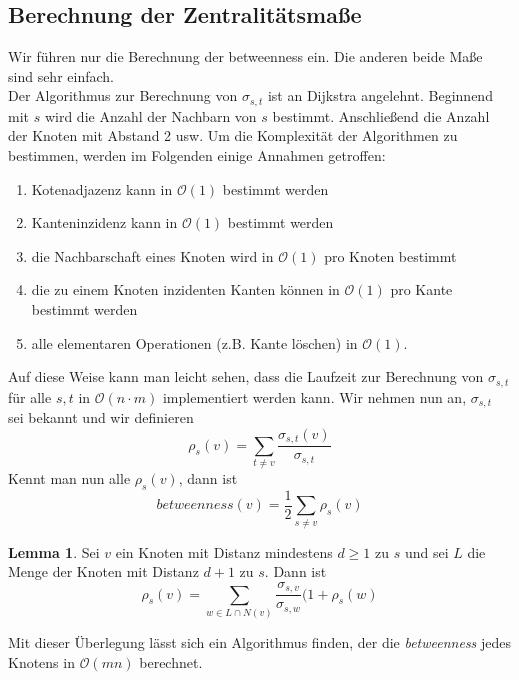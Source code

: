 \documentclass[a4paper, 12pt]{article}
\theoremstyle{plain}
\theoremstyle{definition}
\theoremstyle{lemma}
\newtheorem{lemma}[theorem]{Lemma}
\theoremstyle{remark}
\theoremstyle{corollary}
\theoremstyle{example}
\begin{document}
	\subsection{Berechnung der Zentralitätsmaße}
	Wir führen nur die Berechnung der betweenness ein. Die anderen beide Maße sind sehr einfach.\\
	Der Algorithmus zur Berechnung von $\sigma_{s,t}$ ist an Dijkstra angelehnt. Beginnend mit $s$ wird die Anzahl der Nachbarn von $s$ bestimmt. Anschließend die Anzahl der Knoten mit Abstand 2 usw.
	Um die Komplexität der Algorithmen zu bestimmen, werden im Folgenden einige Annahmen getroffen:
	\begin{enumerate}
		\item Kotenadjazenz kann in $\mathcal{O}(1)$ bestimmt werden
		\item Kanteninzidenz kann in $\mathcal{O}(1)$ bestimmt werden
		\item die Nachbarschaft eines Knoten wird in $\mathcal{O}(1)$ pro Knoten bestimmt
		\item die zu einem Knoten inzidenten Kanten können in $\mathcal{O}(1)$ pro Kante bestimmt werden
		\item alle elementaren Operationen (z.B. Kante löschen) in $\mathcal{O}(1)$.
	\end{enumerate}
	Auf diese Weise kann man leicht sehen, dass die Laufzeit zur Berechnung von $\sigma_{s,t}$ für alle $s,t$ in $\mathcal{O}(n\cdot m)$ implementiert werden kann.
	Wir nehmen nun an, $\sigma_{s,t}$ sei bekannt und wir definieren \[\rho_s(v) = \sum_{t \neq v} \frac{\sigma_{s,t}(v)}{\sigma_{s,t}}\] Kennt man nun alle $\rho_s(v)$, dann ist \[betweenness(v) = \frac{1}{2} \sum_{s \neq v} \rho_s(v)\]
	\begin{lemma}
		Sei $v$ ein Knoten mit Distanz mindestens $d \geq 1$ zu $s$ und sei $L$ die Menge der Knoten mit Distanz $d+1$ zu $s$. Dann ist \[\rho_s(v) = \sum_{w \in L\cap N(v)} \frac{\sigma_{s,v}}{\sigma_{s,w}}(1+\rho_s(w)\]
	\end{lemma}
	Mit dieser Überlegung lässt sich ein Algorithmus finden, der die \textit{betweenness} jedes Knotens in $\mathcal{O}(mn)$ berechnet.
\end{document}
